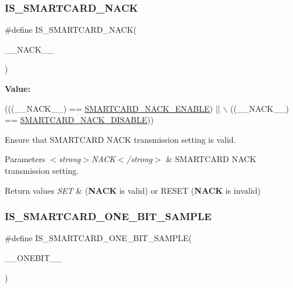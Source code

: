 \subsubsection{\texorpdfstring{I\+S\+\_\+\+S\+M\+A\+R\+T\+C\+A\+R\+D\+\_\+\+N\+A\+CK}{IS\_SMARTCARD\_NACK}}
{\footnotesize\ttfamily \#define I\+S\+\_\+\+S\+M\+A\+R\+T\+C\+A\+R\+D\+\_\+\+N\+A\+CK(\begin{DoxyParamCaption}\item[{}]{\+\_\+\+\_\+\+N\+A\+C\+K\+\_\+\+\_\+ }\end{DoxyParamCaption})}

{\bfseries Value\+:}
\begin{DoxyCode}
(((\_\_NACK\_\_) == \hyperlink{group___s_m_a_r_t_c_a_r_d___n_a_c_k___enable_ga83d350ff558fc372bc2efc5b5a477147}{SMARTCARD\_NACK\_ENABLE}) || \(\backslash\)
                                     ((\_\_NACK\_\_) == \hyperlink{group___s_m_a_r_t_c_a_r_d___n_a_c_k___enable_ga746a79736cf7c2f8478b6c00f7908eda}{SMARTCARD\_NACK\_DISABLE}))
\end{DoxyCode}


Ensure that S\+M\+A\+R\+T\+C\+A\+RD N\+A\+CK transmission setting is valid. 


\begin{DoxyParams}{Parameters}
{\em $<$strong$>$\+N\+A\+C\+K$<$/strong$>$} & S\+M\+A\+R\+T\+C\+A\+RD N\+A\+CK transmission setting. \\
\hline
\end{DoxyParams}

\begin{DoxyRetVals}{Return values}
{\em S\+ET} & ({\bfseries N\+A\+CK} is valid) or R\+E\+S\+ET ({\bfseries N\+A\+CK} is invalid) \\
\hline
\end{DoxyRetVals}
\mbox{\label{group___s_m_a_r_t_c_a_r_d___private___macros_ga101d1102ec58ebd00aef25f285898622}} 
\subsubsection{\texorpdfstring{I\+S\+\_\+\+S\+M\+A\+R\+T\+C\+A\+R\+D\+\_\+\+O\+N\+E\+\_\+\+B\+I\+T\+\_\+\+S\+A\+M\+P\+LE}{IS\_SMARTCARD\_ONE\_BIT\_SAMPLE}}
{\footnotesize\ttfamily \#define I\+S\+\_\+\+S\+M\+A\+R\+T\+C\+A\+R\+D\+\_\+\+O\+N\+E\+\_\+\+B\+I\+T\+\_\+\+S\+A\+M\+P\+LE(\begin{DoxyParamCaption}\item[{}]{\+\_\+\+\_\+\+O\+N\+E\+B\+I\+T\+\_\+\+\_\+ }\end{DoxyParamCaption})}

